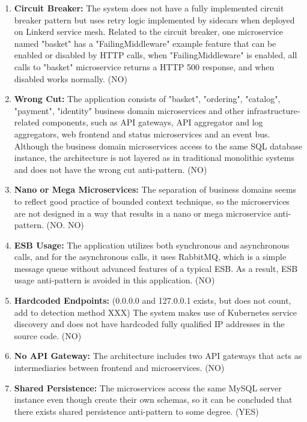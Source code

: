 \documentclass{Configuration_Files/PoliMi3i_thesis}
\begin{document}
\begin{enumerate}
    \item \textbf{Circuit Breaker:} The system does not have a fully implemented circuit breaker pattern but uses retry logic implemented by sidecars when deployed on Linkerd service mesh.
    Related to the circuit breaker, one microservice named "basket" has a "FailingMiddleware" example feature that can be enabled or disabled by HTTP calls, when "FailingMiddleware" is enabled, all calls to "basket" microservice returns a HTTP 500 response, and when disabled works normally. (NO)
    
    \item \textbf{Wrong Cut:} The application consists of "basket", "ordering", "catalog", "payment", "identity" business domain microservices and other infrastructure-related components, such as API gateways, API aggregator and log aggregators, web frontend and status microservices and an event bus.
    Although the business domain microservices access to the same SQL database instance, the architecture is not layered as in traditional monolithic systems and does not have the wrong cut anti-pattern. (NO)
    
    \item \textbf{Nano or Mega Microservices:} The separation of business domains seems to reflect good practice of bounded context technique, so the microservices are not designed in a way that results in a nano or mega microservice anti-pattern. (NO. NO)
    
    \item \textbf{ESB Usage:} The application utilizes both synchronous and asynchronous calls, and for the asynchronous calls, it uses RabbitMQ, which is a simple message queue without advanced features of a typical ESB.
    As a result, ESB usage anti-pattern is avoided in this application. (NO)
    
    \item \textbf{Hardcoded Endpoints:} (0.0.0.0 and 127.0.0.1 exists, but does not count, add to detection method XXX)
    The system makes use of Kubernetes service discovery and does not have hardcoded fully qualified IP addresses in the source code. (NO)
    
    \item \textbf{No API Gateway:} The architecture includes two API gateways that acts as intermediaries between frontend and microservices. (NO)
    
    \item \textbf{Shared Persistence:} The microservices access the same MySQL server instance even though create their own schemas, so it can be concluded that there exists shared persistence anti-pattern to some degree. (YES)
    

\end{enumerate}
\end{document}
